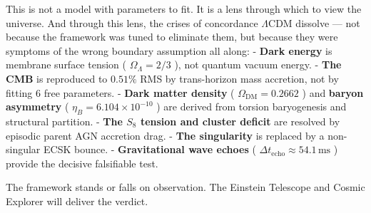 \documentclass[11pt,a4paper]{article}
\theoremstyle{definition}\newtheorem{definition}{Definition}
\theoremstyle{remark}\newtheorem{remark}{Remark}
\begin{document}
This is not a model with parameters to fit. It is a lens through which to view the universe. And through this lens, the crises of concordance $\Lambda\text{CDM}$ dissolve — not because the framework was tuned to eliminate them, but because they were symptoms of the wrong boundary assumption all along:
- \textbf{Dark energy} is membrane surface tension ( $\Omega_\Lambda = 2/3$ ), not quantum vacuum energy.
- \textbf{The CMB} is reproduced to $0.51\%$ RMS by trans-horizon mass accretion, not by fitting 6 free parameters.
- \textbf{Dark matter density} ( $\Omega_{\text{DM}} = 0.2662$ ) and \textbf{baryon asymmetry} ( $\eta_B = 6.104 \times 10^{-10}$ ) are derived from torsion baryogenesis and structural partition.
- \textbf{The $S_8$ tension and cluster deficit} are resolved by episodic parent AGN accretion drag.
- \textbf{The singularity} is replaced by a non-singular ECSK bounce.
- \textbf{Gravitational wave echoes} ( $\Delta t_{\text{echo}} \approx 54.1\,\text{ms}$ ) provide the decisive falsifiable test.

The framework stands or falls on observation. The Einstein Telescope and Cosmic Explorer will deliver the verdict.
\end{document}
